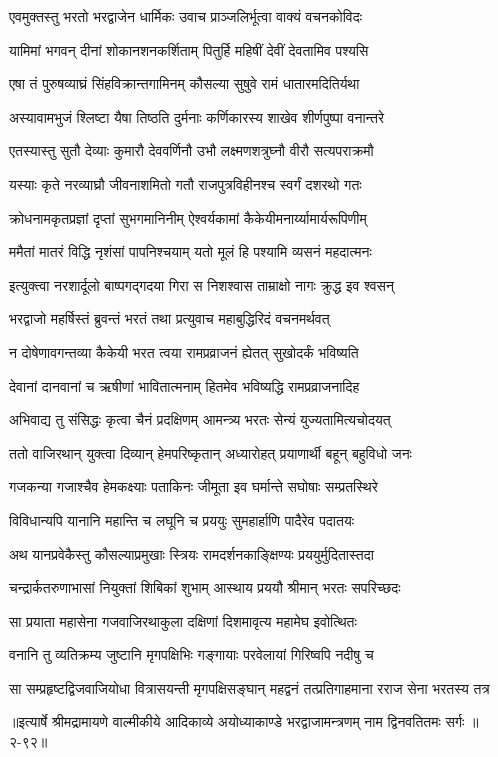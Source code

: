 \twolineshloka
{एवमुक्तस्तु भरतो भरद्वाजेन धार्मिकः}
{उवाच प्राञ्जलिर्भूत्वा वाक्यं वचनकोविदः} %

\twolineshloka
{यामिमां भगवन् दीनां शोकानशनकर्शिताम्}
{पितुर्हि महिषीं देवीं देवतामिव पश्यसि} %

\twolineshloka
{एषा तं पुरुषव्याघ्रं सिंहविक्रान्तगामिनम्}
{कौसल्या सुषुवे रामं धातारमदितिर्यथा} %

\twolineshloka
{अस्यावामभुजं श्लिष्टा यैषा तिष्ठति दुर्मनाः}
{कर्णिकारस्य शाखेव शीर्णपुष्पा वनान्तरे} %

\twolineshloka
{एतस्यास्तु सुतौ देव्याः कुमारौ देववर्णिनौ}
{उभौ लक्ष्मणशत्रुघ्नौ वीरौ सत्यपराक्रमौ} %

\twolineshloka
{यस्याः कृते नरव्याघ्रौ जीवनाशमितो गतौ}
{राजपुत्रविहीनश्च स्वर्गं दशरथो गतः} %

\twolineshloka
{क्रोधनामकृतप्रज्ञां दृप्तां सुभगमानिनीम्}
{ऐश्वर्यकामां कैकेयीमनार्य्यामार्यरूपिणीम्} %

\twolineshloka
{ममैतां मातरं विद्धि नृशंसां पापनिश्चयाम्}
{यतो मूलं हि पश्यामि व्यसनं महदात्मनः} %

\twolineshloka
{इत्युक्त्वा नरशार्दूलो बाष्पगद्गदया गिरा}
{स निशश्वास ताम्राक्षो नागः क्रुद्ध इव श्वसन्} %

\twolineshloka
{भरद्वाजो महर्षिस्तं ब्रुवन्तं भरतं तथा}
{प्रत्युवाच महाबुद्धिरिदं वचनमर्थवत्} %

\twolineshloka
{न दोषेणावगन्तव्या कैकेयी भरत त्वया}
{रामप्रव्राजनं ह्येतत् सुखोदर्कं भविष्यति} %

\twolineshloka
{देवानां दानवानां च ऋषीणां भावितात्मनाम्}
{हितमेव भविष्यद्धि रामप्रव्राजनादिह} %

\twolineshloka
{अभिवाद्य तु संसिद्धः कृत्वा चैनं प्रदक्षिणम्}
{आमन्त्र्य भरतः सेन्यं युज्यतामित्यचोदयत्} %

\twolineshloka
{ततो वाजिरथान् युक्त्वा दिव्यान् हेमपरिष्कृतान्}
{अध्यारोहत् प्रयाणार्थी बहून् बहुविधो जनः} %

\twolineshloka
{गजकन्या गजाश्चैव हेमकक्ष्याः पताकिनः}
{जीमूता इव घर्मान्ते सघोषाः सम्प्रतस्थिरे} %

\twolineshloka
{विविधान्यपि यानानि महान्ति च लघूनि च}
{प्रययुः सुमहार्हाणि पादैरेव पदातयः} %

\twolineshloka
{अथ यानप्रवेकैस्तु कौसल्याप्रमुखाः स्त्रियः}
{रामदर्शनकाङ्क्षिण्यः प्रययुर्मुदितास्तदा} %

\twolineshloka
{चन्द्रार्कतरुणाभासां नियुक्तां शिबिकां शुभाम्}
{आस्थाय प्रययौ श्रीमान् भरतः सपरिच्छदः} %

\twolineshloka
{सा प्रयाता महासेना गजवाजिरथाकुला}
{दक्षिणां दिशमावृत्य महामेघ इवोत्थितः} %

\twolineshloka
{वनानि तु व्यतिक्रम्य जुष्टानि मृगपक्षिभिः}
{गङ्गायाः परवेलायां गिरिष्वपि नदीषु च} %

\twolineshloka
{सा सम्प्रहृष्टद्विजवाजियोधा वित्रासयन्ती मृगपक्षिसङ्घान्}
{महद्वनं तत्प्रतिगाहमाना रराज सेना भरतस्य तत्र} %


॥इत्यार्षे श्रीमद्रामायणे वाल्मीकीये आदिकाव्ये अयोध्याकाण्डे भरद्वाजामन्त्रणम् नाम द्विनवतितमः सर्गः ॥२-९२॥
